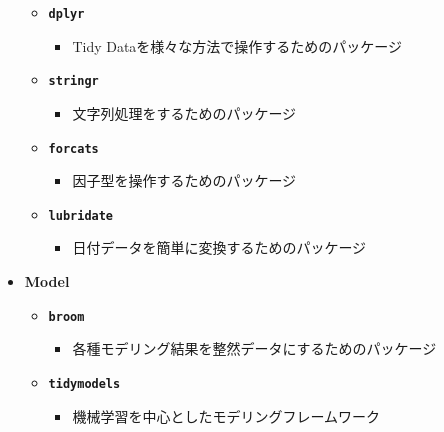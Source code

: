 \documentclass[
  12pt,
]{book}
\providecommand{\tightlist}{%
  \setlength{\itemsep}{0pt}\setlength{\parskip}{0pt}}
\begin{document}
\begin{itemize}
  \begin{itemize}
  \tightlist
  \item
    \textbf{\texttt{dplyr}} \citep{R-dplyr}

    \begin{itemize}
    \tightlist
    \item
      Tidy Dataを様々な方法で操作するためのパッケージ
    \end{itemize}
  \item
    \textbf{\texttt{stringr}} \citep{R-stringr}

    \begin{itemize}
    \tightlist
    \item
      文字列処理をするためのパッケージ
    \end{itemize}
  \item
    \textbf{\texttt{forcats}} \citep{R-forcats}

    \begin{itemize}
    \tightlist
    \item
      因子型を操作するためのパッケージ
    \end{itemize}
  \item
    \textbf{\texttt{lubridate}} \citep{R-lubridate}

    \begin{itemize}
    \tightlist
    \item
      日付データを簡単に変換するためのパッケージ
    \end{itemize}
  \end{itemize}
\item
  \textbf{Model}

  \begin{itemize}
  \tightlist
  \item
    \textbf{\texttt{broom}} \citep{R-broom}

    \begin{itemize}
    \tightlist
    \item
      各種モデリング結果を整然データにするためのパッケージ
    \end{itemize}
  \item
    \textbf{\texttt{tidymodels}}\citep{tidymodels2020, R-tidymodels}

    \begin{itemize}
    \tightlist
    \item
      機械学習を中心としたモデリングフレームワーク
    \end{itemize}
  \end{itemize}
\end{itemize}
\end{document}
